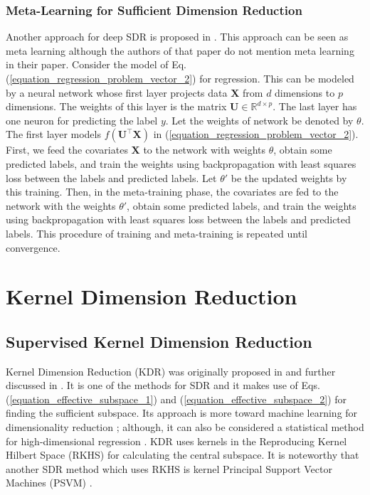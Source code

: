 \documentclass[lang=cn,10pt]{gorgeousnbook}
\numberwithin{equation}{section}%
\numberwithin{figure}{section}%
\begin{document}
\subsubsection{Meta-Learning for Sufficient Dimension Reduction}

Another approach for deep SDR is proposed in \cite{kapla2021fusing}. This approach can be seen as meta learning \cite{finn2017model} although the authors of that paper do not mention meta learning in their paper. 
Consider the model of Eq. (\ref{equation_regression_problem_vector_2}) for regression. 
This can be modeled by a neural network whose first layer projects data $\boldsymbol{X}$ from $d$ dimensions to $p$ dimensions. The weights of this layer is the matrix $\boldsymbol{U} \in \mathbb{R}^{d \times p}$. 
The last layer has one neuron for predicting the label $y$. 
Let the weights of network be denoted by $\theta$. The first layer models $f(\boldsymbol{U}^\top \boldsymbol{X})$ in (\ref{equation_regression_problem_vector_2}). First, we feed the covariates $\boldsymbol{X}$ to the network with weights $\theta$, obtain some predicted labels, and train the weights using backpropagation with least squares loss between the labels and predicted labels. Let $\theta'$ be the updated weights by this training. Then, in the meta-training phase, the covariates are fed to the network with the weights $\theta'$, obtain some predicted labels, and train the weights using backpropagation with least squares loss between the labels and predicted labels. This procedure of training and meta-training is repeated until convergence. 

\section{Kernel Dimension Reduction}\label{section_KDR_methods}

\subsection{Supervised Kernel Dimension Reduction}

Kernel Dimension Reduction (KDR) was originally proposed in \cite{fukumizu2003kernel} and further discussed in \cite{fukumizu2004dimensionality,fukumizu2009kernel}.
It is one of the methods for SDR and it makes use of Eqs. (\ref{equation_effective_subspace_1}) and (\ref{equation_effective_subspace_2}) for finding the sufficient subspace. 
Its approach is more toward machine learning for dimensionality reduction \cite{fukumizu2003kernel,fukumizu2004dimensionality}; although, it can also be considered a statistical method for high-dimensional regression \cite{fukumizu2009kernel}.
KDR uses kernels in the Reproducing Kernel Hilbert Space (RKHS) \cite{ghojogh2021reproducing} for calculating the central subspace. 
It is noteworthy that another SDR method which uses RKHS is kernel Principal Support Vector Machines (PSVM) \cite{li2011principal}. 
\end{document}
